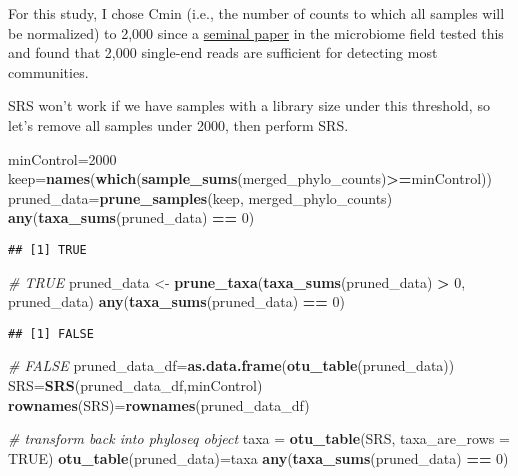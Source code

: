 \documentclass[]{article}
\newenvironment{Shaded}{\begin{snugshade}}{\end{snugshade}}
\newcommand{\CommentTok}[1]{\textcolor[rgb]{0.56,0.35,0.01}{\textit{#1}}}
\newcommand{\DataTypeTok}[1]{\textcolor[rgb]{0.13,0.29,0.53}{#1}}
\newcommand{\DecValTok}[1]{\textcolor[rgb]{0.00,0.00,0.81}{#1}}
\newcommand{\KeywordTok}[1]{\textcolor[rgb]{0.13,0.29,0.53}{\textbf{#1}}}
\newcommand{\NormalTok}[1]{#1}
\newcommand{\OperatorTok}[1]{\textcolor[rgb]{0.81,0.36,0.00}{\textbf{#1}}}
\newcommand{\OtherTok}[1]{\textcolor[rgb]{0.56,0.35,0.01}{#1}}
\newcommand{\StringTok}[1]{\textcolor[rgb]{0.31,0.60,0.02}{#1}}
\begin{document}
For this study, I chose Cmin (i.e., the number of counts to which all
samples will be normalized) to 2,000 since a
\href{https://www.pnas.org/content/108/Supplement_1/4516}{seminal paper}
in the microbiome field tested this and found that 2,000 single-end
reads are sufficient for detecting most communities.

SRS won't work if we have samples with a library size under this
threshold, so let's remove all samples under 2000, then perform SRS.

\begin{Shaded}
\begin{Highlighting}[]
\NormalTok{minControl=}\DecValTok{2000}
\NormalTok{keep=}\KeywordTok{names}\NormalTok{(}\KeywordTok{which}\NormalTok{(}\KeywordTok{sample_sums}\NormalTok{(merged_phylo_counts)}\OperatorTok{>=}\NormalTok{minControl))}
\NormalTok{pruned_data=}\KeywordTok{prune_samples}\NormalTok{(keep, merged_phylo_counts)}
\KeywordTok{any}\NormalTok{(}\KeywordTok{taxa_sums}\NormalTok{(pruned_data) }\OperatorTok{==}\StringTok{ }\DecValTok{0}\NormalTok{)}
\end{Highlighting}
\end{Shaded}

\begin{verbatim}
## [1] TRUE
\end{verbatim}

\begin{Shaded}
\begin{Highlighting}[]
\CommentTok{# TRUE}
\NormalTok{pruned_data <-}\StringTok{ }\KeywordTok{prune_taxa}\NormalTok{(}\KeywordTok{taxa_sums}\NormalTok{(pruned_data) }\OperatorTok{>}\StringTok{ }\DecValTok{0}\NormalTok{, pruned_data)}
\KeywordTok{any}\NormalTok{(}\KeywordTok{taxa_sums}\NormalTok{(pruned_data) }\OperatorTok{==}\StringTok{ }\DecValTok{0}\NormalTok{)}
\end{Highlighting}
\end{Shaded}

\begin{verbatim}
## [1] FALSE
\end{verbatim}

\begin{Shaded}
\begin{Highlighting}[]
\CommentTok{# FALSE}
\NormalTok{pruned_data_df=}\KeywordTok{as.data.frame}\NormalTok{(}\KeywordTok{otu_table}\NormalTok{(pruned_data))}
\NormalTok{SRS=}\KeywordTok{SRS}\NormalTok{(pruned_data_df,minControl)}
\KeywordTok{rownames}\NormalTok{(SRS)=}\KeywordTok{rownames}\NormalTok{(pruned_data_df)}

\CommentTok{# transform back into phyloseq object}
\NormalTok{taxa =}\StringTok{ }\KeywordTok{otu_table}\NormalTok{(SRS, }\DataTypeTok{taxa_are_rows =} \OtherTok{TRUE}\NormalTok{)}
\KeywordTok{otu_table}\NormalTok{(pruned_data)=taxa}
\KeywordTok{any}\NormalTok{(}\KeywordTok{taxa_sums}\NormalTok{(pruned_data) }\OperatorTok{==}\StringTok{ }\DecValTok{0}\NormalTok{)}
\end{Highlighting}
\end{Shaded}
\end{document}
